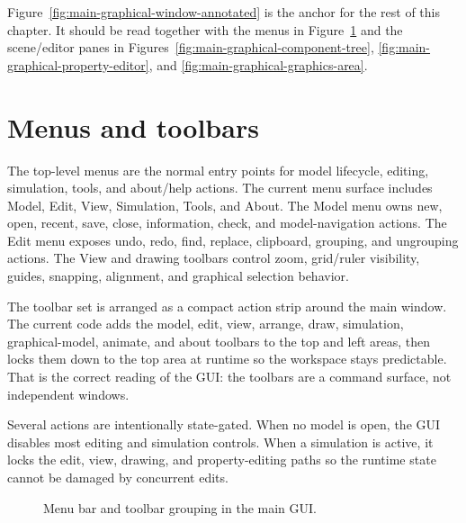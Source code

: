 Figure~\ref{fig:main-graphical-window-annotated} is the anchor for the rest of
this chapter. It should be read together with the menus in
Figure~\ref{fig:main-graphical-menus} and the scene/editor panes in
Figures~\ref{fig:main-graphical-component-tree},
\ref{fig:main-graphical-property-editor}, and
\ref{fig:main-graphical-graphics-area}.

\section{Menus and toolbars}
\label{sec:main-graphical-application-menus}

The top-level menus are the normal entry points for model lifecycle, editing,
simulation, tools, and about/help actions. The current menu surface includes
Model, Edit, View, Simulation, Tools, and About. The Model menu owns new,
open, recent, save, close, information, check, and model-navigation actions.
The Edit menu exposes undo, redo, find, replace, clipboard, grouping, and
ungrouping actions. The View and drawing toolbars control zoom, grid/ruler
visibility, guides, snapping, alignment, and graphical selection behavior.

The toolbar set is arranged as a compact action strip around the main window.
The current code adds the model, edit, view, arrange, draw, simulation,
graphical-model, animate, and about toolbars to the top and left areas, then
locks them down to the top area at runtime so the workspace stays predictable.
That is the correct reading of the GUI: the toolbars are a command surface, not
independent windows.

Several actions are intentionally state-gated. When no model is open, the GUI
disables most editing and simulation controls. When a simulation is active, it
locks the edit, view, drawing, and property-editing paths so the runtime state
cannot be damaged by concurrent edits.

\begin{figure}[htbp]
\centering
{}
\caption{Menu bar and toolbar grouping in the main GUI.}
\label{fig:main-graphical-menus}
\end{figure}

